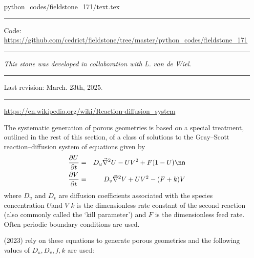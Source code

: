 \begin{flushright} {\tiny {\color{gray} python\_codes/fieldstone\_171/text.tex}} \end{flushright}

%

\par\noindent\rule{\textwidth}{0.4pt}

\begin{center}
\inpython
{\small Code: \url{https://github.com/cedrict/fieldstone/tree/master/python_codes/fieldstone_171}}
\end{center}

\par\noindent\rule{\textwidth}{0.4pt}

{\sl This stone was developed in collaboration with L. van de Wiel}. 

\par\noindent\rule{\textwidth}{0.4pt}

Last revision: March. 23th, 2025.

\par\noindent\rule{\textwidth}{0.4pt}



\url{https://en.wikipedia.org/wiki/Reaction-diffusion_system}

The systematic generation of porous geometries is based on a special treatment, outlined in
the rest of this section, of a class of solutions to the Gray–Scott reaction–diffusion system
of equations given by
\begin{eqnarray}
\frac{\partial U}{\partial t} &=& D_u \vec\nabla^2 U - UV^2 + F(1-U) \nn\\
\frac{\partial V}{\partial t} &=& D_v \vec\nabla^2 V + UV^2 - (F+k)V 
\end{eqnarray}
where $D_u$ and $D_v$ are diffusion coefficients associated with the species concentration $U$and $V$
$k$ is the dimensionless rate constant of the second reaction (also commonly called the `kill 
parameter') and $F$ is the dimensionless feed rate.
Often periodic boundary conditions are used. 

\textcite{gama23} (2023) rely on these equations to generate porous geometries 
and the following values of $D_u,D_v,f,k$ are used:

